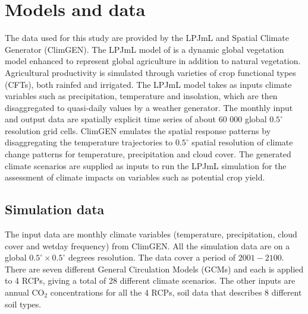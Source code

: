 \section{Models and data}
The data used for this study are provided by the LPJmL and Spatial Climate Generator (ClimGEN).
The LPJmL model of \cite{8} is a dynamic global vegetation model \cite{r34} enhanced to represent global agriculture in addition to natural vegetation. Agricultural productivity is simulated through varieties of crop functional types (CFTs), both rainfed and irrigated. The LPJmL model takes as inputs climate variables such as precipitation, temperature and insolation, which are then disaggregated to quasi-daily values by a weather generator. The monthly input and output data are spatially explicit time series of about 60 000 global $0.5^{\circ}$ resolution grid cells. ClimGEN emulates the spatial response patterns by disaggregating the temperature trajectories to $0.5^{\circ}$ spatial resolution of climate change patterns for temperature, precipitation and cloud cover. The generated climate scenarios are supplied as inputs to run the LPJmL simulation for the assessment of climate impacts on variables such as potential crop yield.

\subsection{Simulation data}\label{data2}
The input data are monthly climate variables (temperature, precipitation, cloud cover and wetday frequency) from ClimGEN. All the simulation data are on a global $0.5^{\circ} \times 0.5^{\circ}$ degrees resolution. The data cover a period of $2001-2100$. There are seven different General Circulation Models (GCMs) and each is applied to 4 RCPs, giving a total of 28 different climate scenarios. The other inputs are annual CO$_2$ concentrations for all the 4 RCPs, soil data that describes 8 different soil types.

